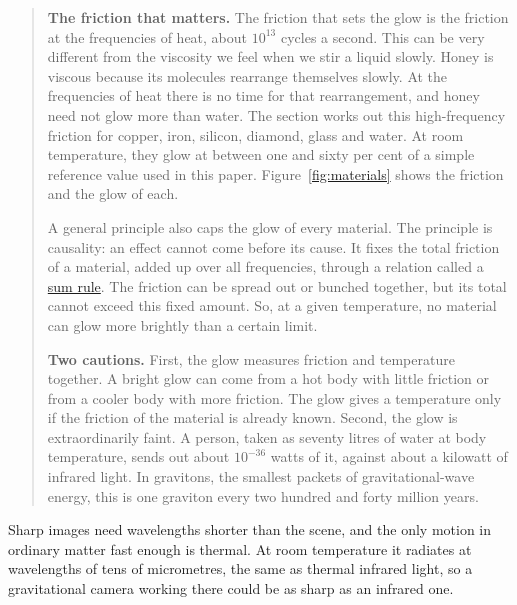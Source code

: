 \begin{quote}
\textbf{The friction that matters.} The friction that sets the glow is the
friction at the frequencies of heat, about $10^{13}$ cycles a second. This can
be very different from the viscosity we feel when we stir a liquid slowly.
Honey is viscous because its molecules rearrange themselves slowly. At the
frequencies of heat there is no time for that rearrangement, and honey need not
glow more than water. The section works out this high-frequency friction for
copper, iron, silicon, diamond, glass and water. At room temperature, they glow
at between one and sixty per cent of a simple reference value used in this
paper. Figure~\ref{fig:materials} shows the friction and the glow of each.

A general principle also caps the glow of every material. The principle is
causality: an effect cannot come before its cause. It fixes the total friction
of a material, added up over all frequencies, through a relation called a
\href{https://en.wikipedia.org/wiki/Kramers-Kronig_relations}{sum rule}. The
friction can be spread out or bunched together, but its total cannot exceed
this fixed amount. So, at a given temperature, no material can glow more
brightly than a certain limit.

\textbf{Two cautions.} First, the glow measures friction and temperature
together. A bright glow can come from a hot body with little friction or from
a cooler body with more friction. The glow gives a temperature only if the
friction of the material is already known. Second, the glow is extraordinarily
faint. A person, taken as seventy litres of water at body temperature, sends
out about $10^{-36}$ watts of it, against about a kilowatt of infrared light.
In gravitons, the smallest packets of gravitational-wave energy, this is one
graviton every two hundred and forty million years.
\end{quote}

Sharp images need wavelengths shorter than the scene, and the only motion in
ordinary matter fast enough is thermal. At room temperature it radiates at
wavelengths of tens of micrometres, the same as thermal infrared light, so a
gravitational camera working there could be as sharp as an infrared one.

